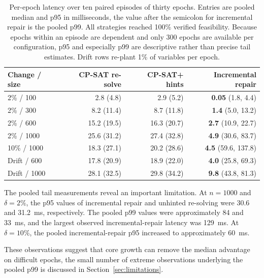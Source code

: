 \documentclass[pdflatex,sn-mathphys-num,iicol,oneside]{sn-jnl}
\newcommand{\cpsat}{\textsc{CP-SAT}\xspace}
\begin{document}
\begin{table}[t]
\centering
\caption{
Per-epoch latency over ten paired episodes of thirty epochs. Entries
are pooled median and p95 in milliseconds, the value after the
semicolon for incremental repair is the pooled p99. All strategies
reached 100\% verified feasibility. Because epochs within an episode
are dependent and only 300 epochs are available per configuration,
p95 and especially p99 are descriptive rather than precise tail
estimates. Drift rows re-plant 1\% of variables per epoch.
}
\label{tab:amortized}
\setlength{\tabcolsep}{6pt}
\small

\begin{tabular}{lrrr}
\toprule
Change / size &
\cpsat re-solve &
\cpsat + hints &
Incremental repair\\
\midrule

2\% / 100
& 2.8 (4.8)
& 2.9 (5.2)
& \textbf{0.05} (1.8, 4.4)\\

2\% / 300
& 8.2 (11.4)
& 8.7 (11.8)
& \textbf{1.4} (5.0, 13.2)\\

2\% / 600
& 15.2 (19.5)
& 16.3 (20.7)
& \textbf{2.7} (10.9, 22.7)\\

2\% / 1000
& 25.6 (31.2)
& 27.4 (32.8)
& \textbf{4.9} (30.6, 83.7)\\

10\% / 1000
& 18.3 (27.1)
& 20.2 (28.6)
& \textbf{4.5} (59.6, 137.8)\\

\midrule

Drift / 600
& 17.8 (20.9)
& 18.9 (22.0)
& \textbf{4.0} (25.8, 69.3)\\

Drift / 1000
& 28.1 (32.5)
& 29.8 (34.2)
& \textbf{9.8} (43.8, 81.3)\\

\bottomrule
\end{tabular}
\normalsize
\end{table}

The pooled tail measurements reveal an important limitation. At
$n=1000$ and $\delta=2\%$, the p95 values of incremental repair and
unhinted re-solving were 30.6 and 31.2~ms, respectively. The pooled
p99 values were approximately 84 and 33~ms, and the largest observed
incremental-repair latency was 129~ms. At $\delta=10\%$, the pooled
incremental-repair p95 increased to approximately 60~ms.

These observations suggest that core growth can remove the median
advantage on difficult epochs, the small number of extreme
observations underlying the pooled p99 is discussed in
Section~\ref{sec:limitations}.
\end{document}
